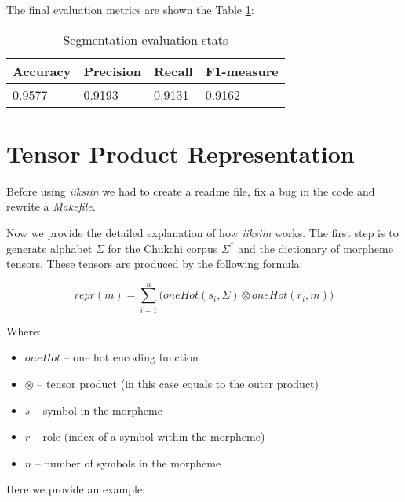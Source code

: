 \documentclass[leqno]{article}
\begin{document}
The final evaluation metrics are shown the Table \ref{tab:segmmetrics}: 
\begin{table}[h]
\centering
\begin{tabular}{|l|l|l|l|}
\hline
Accuracy & Precision & Recall & F1-measure \\ \hline
0.9577   & 0.9193    & 0.9131 & 0.9162     \\ \hline
\end{tabular}
\caption{Segmentation evaluation stats}
\label{tab:segmmetrics}
\end{table}

\section{Tensor Product Representation}

Before using \emph{iiksiin} we had to create a readme file, fix a bug in the code and
rewrite a \textit{Makefile}.

Now we provide the detailed explanation of how \textit{iiksiin} works. The first step is to generate alphabet $\Sigma$ for the Chukchi corpus $\Sigma^{*}$ and the dictionary of morpheme tensors. These tensors are produced by the following formula:

\begin{equation}
    repr(m) = \sum_{i=1}^{n}
    \bigg(oneHot(s_i, \Sigma) \otimes oneHot(r_i, m)\bigg)
\end{equation}

Where:

\begin{itemize}
    \item $oneHot$ -- one hot encoding function
    \item $\otimes$ -- tensor product (in this case equals to the outer product) 
    \item $s$ -- symbol in the morpheme
    \item $r$ -- role (index of a symbol within the morpheme)
    \item $n$ -- number of symbols in the morpheme
\end{itemize}

Here we provide an example:
\end{document}
